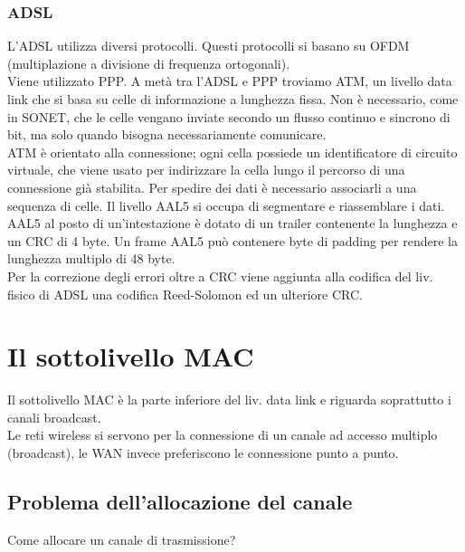 \documentclass{article}
\begin{document}
\subsubsection{ADSL}
L'ADSL utilizza diversi protocolli. Questi protocolli si basano su OFDM (multiplazione a divisione di frequenza ortogonali).\\
Viene utilizzato PPP. A metà tra l'ADSL e PPP troviamo ATM, un livello data link che si basa su celle di informazione a lunghezza fissa. Non è necessario, come in SONET, che le celle vengano inviate secondo un flusso continuo e sincrono di bit, ma solo quando bisogna necessariamente comunicare. \\ ATM è orientato alla connessione; ogni cella possiede un identificatore di circuito virtuale, che viene usato per indirizzare la cella lungo il percorso di una connessione già stabilita. Per spedire dei dati è necessario associarli a una sequenza di celle. Il livello AAL5 si occupa di segmentare e riassemblare i dati. AAL5 al posto di un'intestazione è dotato di un trailer contenente la lunghezza e un CRC di 4 byte. Un frame AAL5 può contenere byte di padding per rendere la lunghezza multiplo di 48 byte. \\
Per la correzione degli errori oltre a CRC viene aggiunta alla codifica del liv. fisico di ADSL una codifica Reed-Solomon ed un ulteriore CRC.
\newpage

\section{Il sottolivello MAC}
Il sottolivello MAC è la parte inferiore del liv. data link e riguarda soprattutto i canali broadcast. \\
Le reti wireless si servono per la connessione di un canale ad accesso multiplo (broadcast), le WAN invece preferiscono le connessione punto a punto. \\
\subsection{Problema dell'allocazione del canale}
Come allocare un canale di trasmissione?
\end{document}
